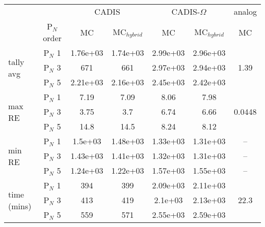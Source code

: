 \begin{tabular}{lc|ccccc}
\toprule
{} & {} & \multicolumn{2}{c}{CADIS}  & \multicolumn{2}{c}{CADIS-$\Omega$}  & analog \\
{} &  P$_N$ order &     MC  &   MC$_{hybrid}$ & MC & MC$_{hybrid}$ &  MC \\
\midrule
\multirow{3}{*}{tally avg} &  P$_N$ 1 &    1.76e+03 &  1.74e+03 &   2.99e+03 &
2.96e+03 &    \multirow{3}{*}{1.39} \\
     {}    &  P$_N$ 3 &         671 &       661 &   2.97e+03 &     2.94e+03 & {} \\
     {}    &  P$_N$ 5 &    2.21e+03 &  2.16e+03 &   2.45e+03 &     2.42e+03 & {}  \\
\midrule
\multirow{3}{*}{max RE} &  P$_N$ 1 &        7.19 &      7.09 &       8.06 &
7.98 &  \multirow{3}{*}{0.0448} \\
     {}    &  P$_N$ 3 &        3.75 &       3.7 &       6.74 &         6.66 & {} \\
     {}    &  P$_N$ 5 &        14.8 &      14.5 &       8.24 &         8.12 & {} \\
\midrule
\multirow{3}{*}{min RE} &  P$_N$ 1 &     1.5e+03 &  1.48e+03 &   1.33e+03 &     1.31e+03 &      -- \\
     {}    &  P$_N$ 3 &    1.43e+03 &  1.41e+03 &   1.32e+03 &     1.31e+03 &      -- \\
     {}    &  P$_N$ 5 &    1.24e+03 &  1.22e+03 &   1.57e+03 &     1.55e+03 &      -- \\
\midrule
\multirow{3}{*}{time (mins)} &  P$_N$ 1 &         394 &       399 &   2.09e+03 &
2.11e+03 &    \multirow{3}{*}{22.3} \\
     {}    &  P$_N$ 3 &         413 &       419 &    2.1e+03 &     2.13e+03 & {}  \\
     {}    &  P$_N$ 5 &         559 &       571 &   2.55e+03 &     2.59e+03 & {} \\
\bottomrule
\end{tabular}
